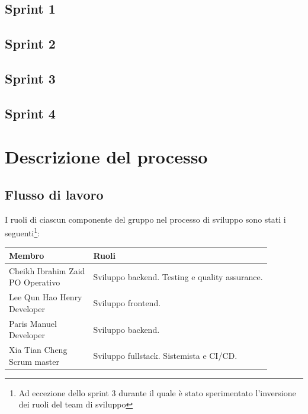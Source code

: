 \documentclass[11pt]{article}
\begin{document}
\subsection{Sprint 1}

\newpage

\subsection{Sprint 2}

\newpage

\subsection{Sprint 3}

\newpage

\subsection{Sprint 4}

\newpage


\newpage
\section{Descrizione del processo}

\subsection{Flusso di lavoro}
I ruoli di ciascun componente del gruppo nel processo di sviluppo sono stati i 
seguenti\footnote{Ad eccezione dello sprint 3 durante il quale è stato sperimentato l'inversione dei ruoli del team di sviluppo}:
\begin{center}
    \begin{tabular}{ | m{4cm} | m{10cm} | }
        \hline
        {\textbf{Membro}} & {\textbf{Ruoli}} \\
        \hline
        \makecell[cl]{Cheikh Ibrahim Zaid\\{\footnotesize PO Operativo}} & Sviluppo backend. Testing e quality assurance. \\ 
        \hline
        \makecell[cl]{Lee Qun Hao Henry\\{\footnotesize Developer}} & Sviluppo frontend. \\ 
        \hline
        \makecell[cl]{Paris Manuel\\{\footnotesize Developer}} & Sviluppo backend. \\ 
        \hline
        \makecell[cl]{Xia Tian Cheng\\{\footnotesize Scrum master}} & Sviluppo fullstack. Sistemista e CI/CD. \\ 
        \hline
    \end{tabular}
\end{center}
\end{document}
